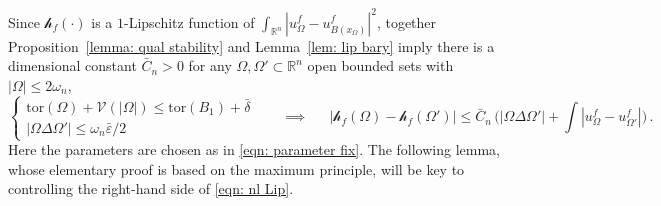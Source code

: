 \documentclass[10pt, reqno]{amsart}
\numberwithin{equation}{section}
\def\R{{\mathbb R}}
\def\e{\varepsilon}
\def\W{\Omega}
\def\tor{\mathrm{tor}}
\def\vo{\mathscr{V}}
\def\nl{\mathscr{h}_f}
\def\baryEps{\bar{\e}}
\def\ccdel{\bar{\delta}}
\begin{document}
Since  $\nl(\cdot )$ is a $1$-Lipschitz function  of $\int_{\R^n} |u_\W^f - u_{B(x_\W)}^f|^2$, together Proposition~\ref{lemma: qual stability} and Lemma~\ref{lem: lip bary} imply there is a dimensional constant $\bar{C}_n>0$
 for any  $\W, \W'\subset\R^n$ open bounded sets with $|\W|\leq 2\omega_n$, 
\begin{equation}\label{eqn: nl Lip}
\begin{cases}
\tor(\W) +\vo(|\W|) \leq \tor(B_1) + \ccdel & \\
 |\W\Delta \W'|\leq \omega_n  \baryEps /{2}  &\end{cases} \quad
\implies \quad \ \ |\nl(\W) - \nl(\W')|  \leq \bar{C}_n\,\Big( |\W\Delta \W'| +\int |u_{\W}^f - u_{\W'}^f|\Big)\,.
	 	\end{equation}
Here the parameters are chosen as in \eqref{eqn: parameter fix}.
The following lemma, whose elementary proof is based on the maximum principle, will be key to controlling the right-hand side of \eqref{eqn: nl Lip}.
\end{document}

